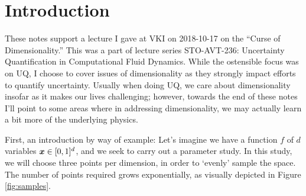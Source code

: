 \documentclass{article}
\begin{document}
\section{Introduction}
These notes support a lecture I gave at VKI on 2018-10-17 on the ``Curse of
Dimensionality.'' This was a part of lecture series STO-AVT-236: Uncertainty
Quantification in Computational Fluid Dynamics. While the ostensible focus was
on UQ, I choose to cover issues of dimensionality as they strongly impact
efforts to quantify uncertainty. Usually when doing UQ, we care about
dimensionality insofar as it makes our lives challenging; however, towards the
end of these notes I'll point to some areas where in addressing dimensionality,
we may actually learn a bit more of the underlying physics.

First, an introduction by way of example: Let's imagine we have a function $f$
of $d$ variables $\boldsymbol{x}\in[0,1]^d$, and we seek to carry out a parameter study. In
this study, we will choose three points per dimension, in order to `evenly'
sample the space. The number of points required grows exponentially,
as visually depicted in Figure \ref{fig:samples}.
\end{document}
